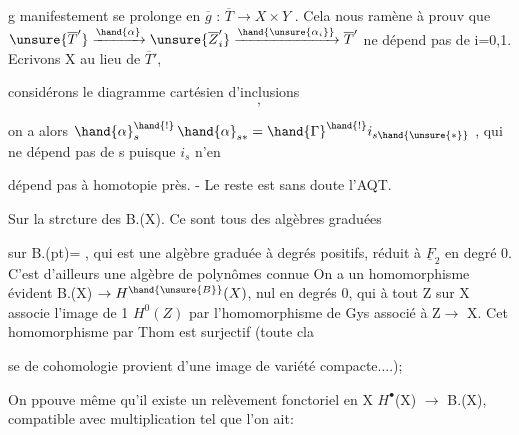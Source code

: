 
g manifestement se prolonge en $\overline{g}$ : $\overline{T}\to X\times Y$ . Cela nous ramène à prouv
que \hand{(}$\unsure{\overline{T}'}\xrightarrow{\hand{\alpha}}\unsure{\overline{Z}'_i}\xrightarrow{\hand{\unsure{\alpha_i}}}\overline{T}'$\hand{)} ne dépend pas de i=0,1. Ecrivons X au lieu de $\overline{T}'$,

considérons le diagramme cartésien d'inclusions
\[ , \]

on a alors $\hand{\alpha}^{\hand{!}}_s\,\hand{\alpha}_{s*} = \hand{\Gamma}^{\hand{!}}i_{s\hand{\unsure{*}}}$ , qui ne dépend pas de s puisque $i_s$ n'en

dépend pas à homotopie près. - Le reste est sans doute l'AQT.

Sur la strcture des B.(X). Ce sont tous des algèbres graduées

sur B.(pt)=\hand{$\Lambda$} , qui est une algèbre graduée à degrés positifs, réduit
à $\underline{F}_2$ en degré 0. C'est d'ailleurs une algèbre de polynômes connue
On a un homomorphisme évident B.(X) $\to H^{\hand{\unsure{B}}}(X)$, nul en degrés \hand{$>$}0, qui
à tout Z sur X associe l'image de 1 \hand{$\in$} $H^0(Z)$ par l'homomorphisme de Gys
associé à Z$\to$ X. Cet homomorphisme par Thom est surjectif (toute cla

se de cohomologie provient d'une image de variété compacte....); 

On ppouve même qu'il existe un relèvement fonctoriel en X
$H^\bullet$(X) $\to$ B.(X), \hand{(}compatible avec multiplication\hand{)} tel que l'on ait:

